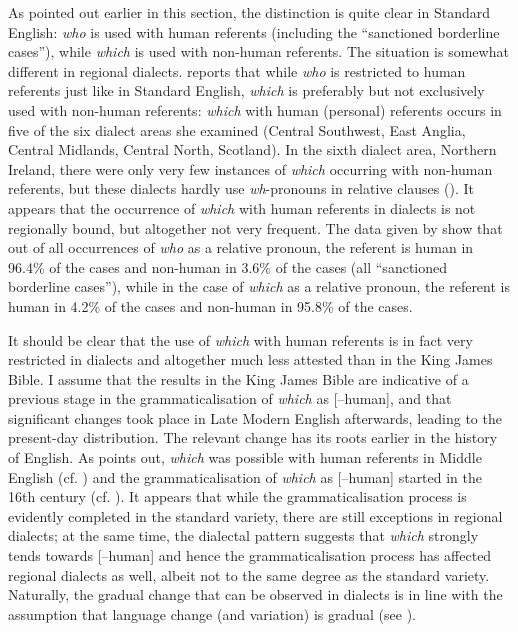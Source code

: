 As pointed out earlier in this section, the distinction is quite clear in Standard English: \textit{who} is used with human referents (including the ``sanctioned borderline cases''), while \textit{which} is used with non-human referents. The situation is somewhat different in regional dialects. \citet[41--42]{herrmann2005} reports that while \textit{who} is restricted to human referents just like in Standard English, \textit{which} is preferably but not exclusively used with non-human referents: \textit{which} with human (personal) referents occurs in five of the six dialect areas she examined (Central Southwest, East Anglia, Central Midlands, Central North, Scotland). In the sixth dialect area, Northern Ireland, there were only very few instances of \textit{which} occurring with non-human referents, but these dialects hardly use \textit{wh}-pronouns in relative clauses (\citealt[41]{herrmann2005}). It appears that the occurrence of \textit{which} with human referents in dialects is not regionally bound, but altogether not very frequent. The data given by \citet[41, Table 3]{herrmann2005} show that out of all occurrences of \textit{who} as a relative pronoun, the referent is human in 96.4\% of the cases and non-human in 3.6\% of the cases (all ``sanctioned borderline cases''), while in the case of \textit{which} as a relative pronoun, the referent is human in 4.2\% of the cases and non-human in 95.8\% of the cases. 

It should be clear that the use of \textit{which} with human referents is in fact very restricted in dialects and altogether much less attested than in the King James Bible. I assume that the results in the King James Bible are indicative of a previous stage in the grammaticalisation of \textit{which} as [--human], and that significant changes took place in Late Modern English afterwards, leading to the present-day distribution. The relevant change has its roots earlier in the history of English. As \citet[41]{herrmann2005} points out, \textit{which} was possible with human referents in Middle English (cf. \citealt{mosse1991}) and the grammaticalisation of \textit{which} as [--human] started in the 16th century (cf. \citealt{nevalainenraumolinbrunberg2002}). It appears that while the grammaticalisation process is evidently completed in the standard variety, there are still exceptions in regional dialects; at the same time, the dialectal pattern suggests that \textit{which} strongly tends towards [--human] and hence the grammaticalisation process has affected regional dialects as well, albeit not to the same degree as the standard variety. Naturally, the gradual change that can be observed in dialects is in line with the assumption that language change (and variation) is gradual (see \citealt{traugotttrousdale2010}).\largerpage

